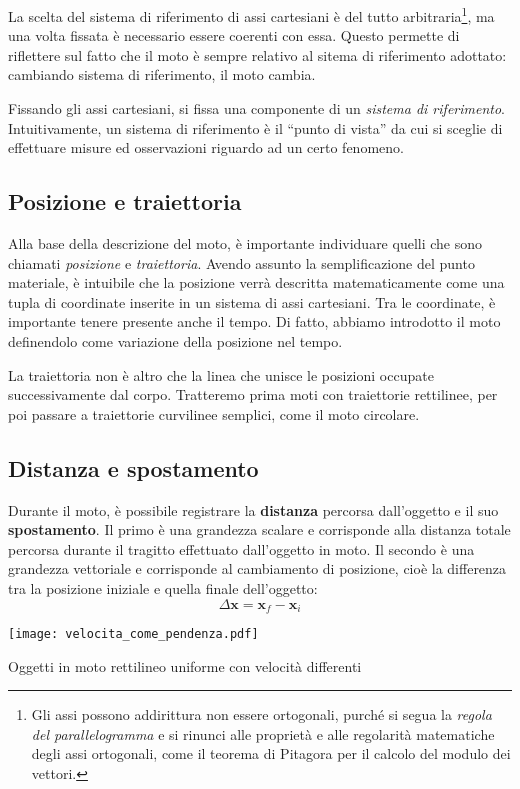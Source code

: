 La scelta del sistema di riferimento di assi cartesiani è del tutto arbitraria\footnote{
Gli assi possono addirittura non essere ortogonali, purché si segua la \textit{regola del
parallelogramma} e si rinunci alle proprietà e alle regolarità matematiche degli
assi ortogonali, come il teorema di Pitagora per il calcolo del modulo dei
vettori.}, ma una volta fissata è necessario essere coerenti con essa.
Questo permette di riflettere sul fatto che il moto è sempre relativo al sitema di
riferimento adottato: cambiando sistema di riferimento, il moto cambia.

Fissando gli assi cartesiani, si fissa una componente di un \textit{sistema di
riferimento}. Intuitivamente, un sistema di riferimento è il ``punto di vista''
da cui si sceglie di effettuare misure ed osservazioni riguardo ad un certo
fenomeno.

\subsection*{Posizione e traiettoria}
Alla base della descrizione del moto, è importante individuare quelli che sono
chiamati \textit{posizione} e \textit{traiettoria}. Avendo assunto la semplificazione
del punto materiale, è intuibile che la posizione verrà descritta matematicamente
come una tupla di coordinate inserite in un sistema di assi cartesiani. Tra le
coordinate, è importante tenere presente anche il tempo. Di fatto, abbiamo
introdotto il moto definendolo come variazione della posizione nel tempo.

La traiettoria non è altro che la linea che unisce le posizioni occupate
successivamente dal corpo. Tratteremo prima moti con traiettorie rettilinee,
per poi passare a traiettorie curvilinee semplici, come il moto circolare.


\subsection*{Distanza e spostamento}
Durante il moto, è possibile registrare la \textbf{distanza} percorsa
dall'oggetto e il suo \textbf{spostamento}. Il primo è una grandezza
scalare e corrisponde alla distanza totale percorsa durante il tragitto
effettuato dall'oggetto in moto. Il secondo è una grandezza vettoriale e
corrisponde al cambiamento di posizione,
cioè la differenza tra la posizione iniziale e quella finale dell'oggetto:
\[ \Delta \mathbf{x} = \mathbf{x}_f - \mathbf{x}_i \]


\begin{marginfigure}
    \centering
    \texttt{[image: velocita\_come\_pendenza.pdf]}
    \caption{Oggetti in moto rettilineo uniforme con velocità differenti}
\end{marginfigure}


